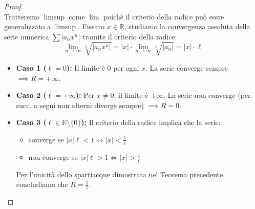 \documentclass[a4paper, oneside]{article}
\newcommand\bulletout  {\labelitemfont \textbullet}
\begin{document}
\begin{proof}
  \hfil\\
  Tratteremo $\limsup$ come $\lim$ poichè il criterio della radice può essre generalizzato a $\limsup$.
  Fissato $x \in \mathbb{R}$, studiamo la convergenza assoluta della serie numerica $\sum |a_n x^n|$ tramite il criterio della radice:
  \[ \lim_{n \to \infty} \sqrt[n]{|a_n x^n|} = |x| \cdot \lim_{n \to \infty} \sqrt[n]{|a_n|} = |x| \cdot \ell \]

  \begin{itemize}
    \item \textbf{Caso 1 ($\ell = 0$):} Il limite è $0$ per ogni $x$. La serie converge sempre $\implies R = +\infty$.
    \item \textbf{Caso 2 ($\ell = +\infty$):} Per $x \neq 0$, il limite è $+\infty$. La serie non converge (per succ. a segni non alterni diverge sempre) $\implies R = 0$.
    \item \textbf{Caso 3 ($\ell \in \mathbb{R} \setminus \{0\}$):} 
    Il criterio della radice implica che la serie:
    \begin{itemize}
        \item converge se $|x|\ell < 1 \iff |x| < \frac{1}{\ell}$
        \item non converge se $|x|\ell > 1 \iff |x| > \frac{1}{\ell}$
    \end{itemize}
    Per l'unicità dello spartiacque dimostrata nel Teorema precedente, concludiamo che $R = \frac{1}{\ell}$.
  \end{itemize}
\end{proof}
\end{document}
